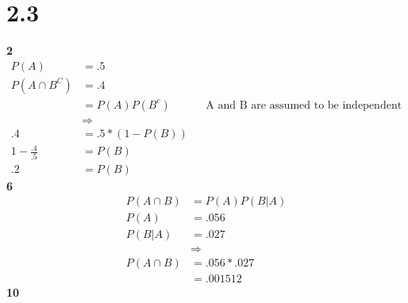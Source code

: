 \documentclass[12pt]{report}
\begin{document}
\section*{2.3}
         {\bf 2}
         \begin{align*}
           P(A)&=.5\\
           P(A\cap B^C)&=.4\\
           &=P(A)P(B^c)&&\text{A and B are assumed to be independent}\\
           &\Rightarrow\\
           .4&=.5*(1-P(B))\\
           1-\frac{.4}{.5}&=P(B)\\
           .2&=P(B)
         \end{align*}
  {\bf 6}
             \begin{align*}
               P(A \cap B)&= P(A)P(B|A)\\
               P(A)&= .056\\
               P(B|A)&=.027\\
               &\Rightarrow\\
               P(A\cap B)&= .056*.027\\
               &=.001512
             \end{align*}
                 {\bf 10}
\end{document}
